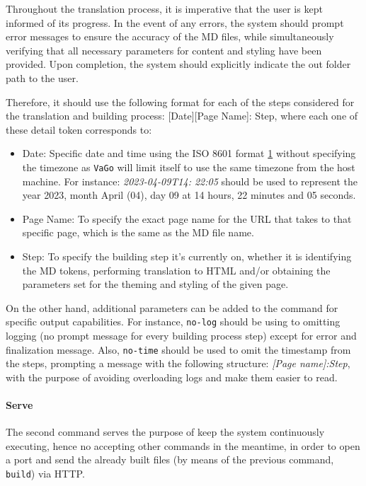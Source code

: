 Throughout the translation process, it is imperative that the user is
kept informed of its progress. In the event of any errors, the system
should prompt error messages to ensure the accuracy of the MD files,
while simultaneously verifying that all necessary parameters for content
and styling have been provided. Upon completion, the system should
explicitly indicate the out folder path to the user.

Therefore, it should use the following format for each of the steps
considered for the translation and building process: {[}Date{]}{[}Page
Name{]}: Step, where each one of these detail token corresponds to:

\begin{itemize}
    \item
    Date: Specific date and time using the ISO 8601 format
    \href{https://en.wikipedia.org/wiki/ISO_8601}{1} without specifying
    the timezone as \texttt{VaGo} will limit itself to use the same
    timezone from the host machine. For instance: \emph{2023-04-09T14:
    22:05} should be used to represent the year 2023, month April (04),
    day 09 at 14 hours, 22 minutes and 05 seconds.
    \item
    Page Name: To specify the exact page name for the URL that takes to
    that specific page, which is the same as the MD file name.
    \item
    Step: To specify the building step it's currently on, whether it is
    identifying the MD tokens, performing translation to HTML and/or
    obtaining the parameters set for the theming and styling of the given
    page.
\end{itemize}

On the other hand, additional parameters can be added to the command for
specific output capabilities. For instance, \texttt{no-log} should be
using to omitting logging (no prompt message for every building process
step) except for error and finalization message. Also, \texttt{no-time}
should be used to omit the timestamp from the steps, prompting a message
with the following structure: \emph{{[}Page name{]}:Step}, with the
purpose of avoiding overloading logs and make them easier to read.

\paragraph{Serve}\label{par:serve}

The second command serves the purpose of keep the system continuously
executing, hence no accepting other commands in the meantime, in order
to open a port and send the already built files (by means of the
previous command, \texttt{build}) via HTTP.

